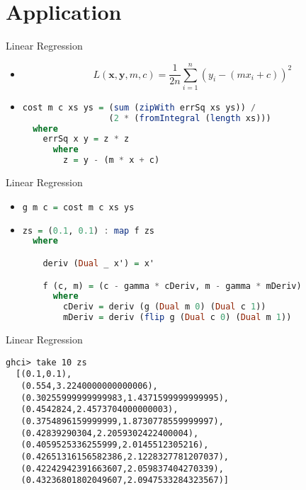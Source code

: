 \documentclass{beamer}
\begin{document}
\section{Application}

\begin{frame}[fragile]{Linear Regression}
\begin{itemize}
\item
$$
L(\boldsymbol{x}, \boldsymbol{y}, m, c) = \frac{1}{2n}\sum_{i=1}^n (y_i - (mx_i + c))^2
$$

\pause
\item
\begin{scriptsize}
\begin{lstlisting}[language=Haskell]
cost m c xs ys = (sum (zipWith errSq xs ys)) /
                 (2 * (fromIntegral (length xs)))
  where
    errSq x y = z * z
      where
        z = y - (m * x + c)
\end{lstlisting}
\end{scriptsize}
\end{itemize}
\end{frame}

\begin{frame}[fragile]{Linear Regression}
\begin{itemize}
\item
\begin{scriptsize}
\begin{lstlisting}[language=Haskell]
g m c = cost m c xs ys
\end{lstlisting}
\end{scriptsize}

\pause
\item
\begin{scriptsize}
\begin{lstlisting}[language=Haskell]
zs = (0.1, 0.1) : map f zs
  where

    deriv (Dual _ x') = x'

    f (c, m) = (c - gamma * cDeriv, m - gamma * mDeriv)
      where
        cDeriv = deriv (g (Dual m 0) (Dual c 1))
        mDeriv = deriv (flip g (Dual c 0) (Dual m 1))
\end{lstlisting}
\end{scriptsize}
\end{itemize}
\end{frame}

\begin{frame}[fragile]{Linear Regression}
\begin{scriptsize}
\begin{lstlisting}
ghci> take 10 zs
  [(0.1,0.1),
   (0.554,3.2240000000000006),
   (0.30255999999999983,1.4371599999999995),
   (0.4542824,2.4573704000000003),
   (0.3754896159999999,1.8730778559999997),
   (0.42839290304,2.2059302422400004),
   (0.4059525336255999,2.0145512305216),
   (0.42651316156582386,2.1228327781207037),
   (0.42242942391663607,2.059837404270339),
   (0.43236801802049607,2.0947533284323567)]
\end{lstlisting}
\end{scriptsize}
\end{frame}
\end{document}
